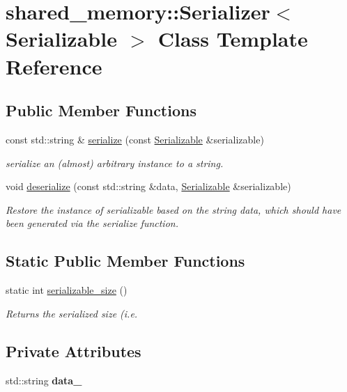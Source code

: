 \hypertarget{classshared__memory_1_1Serializer}{}\section{shared\+\_\+memory\+:\+:Serializer$<$ Serializable $>$ Class Template Reference}
\label{classshared__memory_1_1Serializer}
\subsection*{Public Member Functions}
\begin{DoxyCompactItemize}
\item 
const std\+::string \& \hyperlink{classshared__memory_1_1Serializer_a61ea01a0e5e28fc24c9274455050b1c1}{serialize} (const \hyperlink{classSerializable}{Serializable} \&serializable)
\begin{DoxyCompactList}\small\item\em serialize an (almost) arbitrary instance to a string. \end{DoxyCompactList}\item 
void \hyperlink{classshared__memory_1_1Serializer_a8f674c9b3a7c053403112d2fad4e09a9}{deserialize} (const std\+::string \&data, \hyperlink{classSerializable}{Serializable} \&serializable)
\begin{DoxyCompactList}\small\item\em Restore the instance of serializable based on the string data, which should have been generated via the serialize function. \end{DoxyCompactList}\end{DoxyCompactItemize}
\subsection*{Static Public Member Functions}
\begin{DoxyCompactItemize}
\item 
static int \hyperlink{classshared__memory_1_1Serializer_af5edd0af254d6061e8e18c0bbec10aa9}{serializable\+\_\+size} ()
\begin{DoxyCompactList}\small\item\em Returns the serialized size (i.\+e. \end{DoxyCompactList}\end{DoxyCompactItemize}
\subsection*{Private Attributes}
\begin{DoxyCompactItemize}
\item 
\mbox{\label{classshared__memory_1_1Serializer_ad1fb7ce2b9dfde8e609aa770a3f97e72}} 
std\+::string {\bfseries data\+\_\+}
\end{DoxyCompactItemize}


